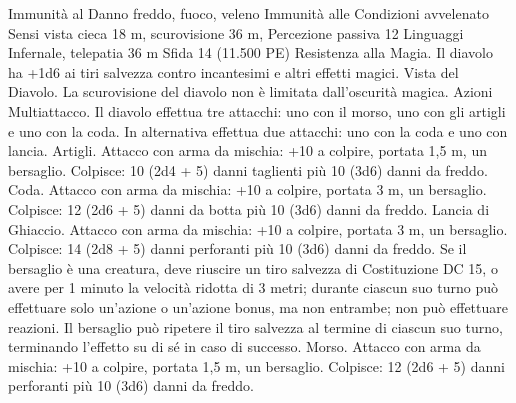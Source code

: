 \begin{multicols}{2}
Immunità al Danno freddo, fuoco, veleno
Immunità alle Condizioni avvelenato
Sensi vista cieca 18 m, scurovisione 36 m, Percezione passiva 12
Linguaggi Infernale, telepatia 36 m
Sfida 14 (11.500 PE)
Resistenza alla Magia. Il diavolo ha +1d6 ai tiri salvezza
contro incantesimi e altri effetti magici.
Vista del Diavolo. La scurovisione del diavolo non è limitata
dall’oscurità magica.
Azioni
Multiattacco. Il diavolo effettua tre attacchi: uno con il morso,
uno con gli artigli e uno con la coda. In alternativa effettua due
attacchi: uno con la coda e uno con lancia.
Artigli. Attacco con arma da mischia: +10 a colpire, portata 1,5
m, un bersaglio.
Colpisce: 10 (2d4 + 5) danni taglienti più 10 (3d6) danni da
freddo.
Coda. Attacco con arma da mischia: +10 a colpire, portata 3 m,
un bersaglio.
Colpisce: 12 (2d6 + 5) danni da botta più 10 (3d6) danni da
freddo.
Lancia di Ghiaccio. Attacco con arma da mischia: +10 a colpire,
portata 3 m, un bersaglio.
Colpisce: 14 (2d8 + 5) danni perforanti più 10 (3d6) danni da
freddo. Se il bersaglio è una creatura, deve riuscire un tiro
salvezza di Costituzione DC 15, o avere per 1 minuto la velocità
ridotta di 3 metri; durante ciascun suo turno può effettuare solo
un’azione o un’azione bonus, ma non entrambe; non può
effettuare reazioni. Il bersaglio può ripetere il tiro salvezza al
termine di ciascun suo turno, terminando l’effetto su di sé in caso
di successo.
Morso. Attacco con arma da mischia: +10 a colpire, portata 1,5
m, un bersaglio.
Colpisce: 12 (2d6 + 5) danni perforanti più 10 (3d6) danni da
freddo.
 

\end{multicols}
